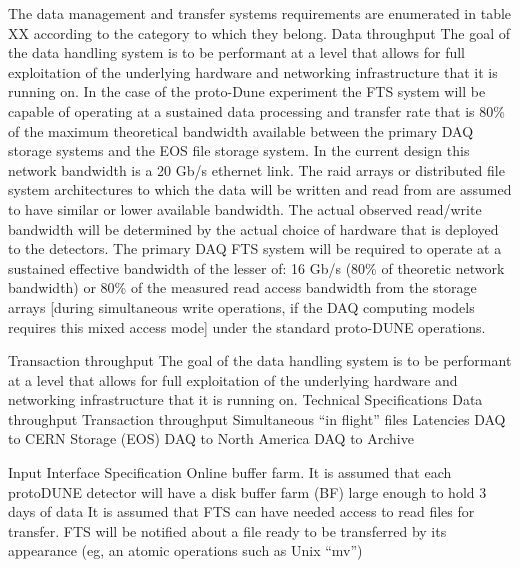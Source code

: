 The data management and transfer systems requirements are enumerated in table XX according to the category to which they belong.
Data throughput
The goal of the data handling system is to be performant at a level that allows for full exploitation of the underlying hardware and networking infrastructure that it is running on.  In the case of the proto-Dune experiment the FTS system will be capable of operating at a sustained data processing and transfer rate that is 80\% of the maximum theoretical bandwidth available between the primary DAQ storage systems and the EOS file storage system.  In the current design this network bandwidth is a 20 Gb/s ethernet link.  The raid arrays or distributed file system architectures to which the data will be written and read from are assumed to have similar or lower available bandwidth.  The actual observed read/write bandwidth will be determined by the actual choice of hardware that is deployed to the detectors.  The primary DAQ FTS system will be required to operate at a sustained effective bandwidth of the lesser of: 16 Gb/s (80\% of theoretic network bandwidth) or 80\% of the measured read access bandwidth from the storage arrays [during simultaneous write operations, if the DAQ computing models requires this mixed access mode] under the standard proto-DUNE operations.

Transaction throughput
The goal of the data handling system is to be performant at a level that allows for full exploitation of the underlying hardware and networking infrastructure that it is running on. 
Technical Specifications
Data throughput
Transaction throughput
Simultaneous “in flight” files
Latencies
DAQ to CERN Storage (EOS)
DAQ to North America
DAQ to Archive

Input Interface Specification
Online buffer farm.
It is assumed that each protoDUNE detector will have a disk buffer farm (BF) large enough to hold 3 days of data
It is assumed that FTS can have needed access to read files for transfer.
FTS will be notified about a file ready to be transferred by its appearance (eg, an atomic operations such as Unix ``mv'')

